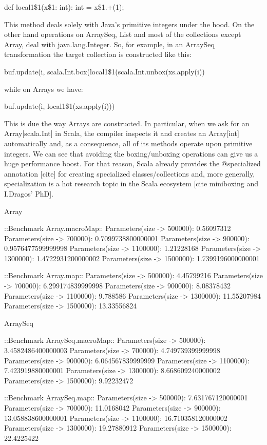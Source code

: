 def local1\$1(x\$1: int): int = x\$1.+(1);

This method deals solely with Java's primitive integers under the hood. On the
other hand operations on ArraySeq, List and most of the collections except
Array, deal with java.lang.Integer. So, for example, in an ArraySeq
transformation the target collection is constructed like this:

buf.update(i, scala.Int.box(local1\$1(scala.Int.unbox(xs.apply(i))

while on Arrays we have:

buf.update(i, local1\$1(xs.apply(i)))

This is due the way Arrays are constructed. In particular, when we ask for an
Array[scala.Int] in Scala, the compiler inspects it and creates an
Array[int] automatically and, as a consequence, all of its methods operate upon
primitive integers. We can see that avoiding the boxing/unboxing operations can
give us a huge performance boost. For that reason, Scala already provides the
@specialized annotation [cite] for creating specialized classes/collections and,
more generally, specialization is a hot research topic in the Scala ecosystem
[cite miniboxing and I.Dragos' PhD].

Array

::Benchmark Array.macroMap::
Parameters(size -> 500000): 0.56097312
Parameters(size -> 700000): 0.7099738800000001
Parameters(size -> 900000): 0.9576477599999998
Parameters(size -> 1100000): 1.21228168
Parameters(size -> 1300000): 1.4722931200000002
Parameters(size -> 1500000): 1.7399196000000001

::Benchmark Array.map::
Parameters(size -> 500000): 4.45799216
Parameters(size -> 700000): 6.299174839999998
Parameters(size -> 900000): 8.08378432
Parameters(size -> 1100000): 9.788586
Parameters(size -> 1300000): 11.55207984
Parameters(size -> 1500000): 13.33556824


ArraySeq

::Benchmark ArraySeq.macroMap::
Parameters(size -> 500000): 3.4582486400000003
Parameters(size -> 700000): 4.749739399999998
Parameters(size -> 900000): 6.064567839999999
Parameters(size -> 1100000): 7.423919880000001
Parameters(size -> 1300000): 8.668609240000002
Parameters(size -> 1500000): 9.92232472

::Benchmark ArraySeq.map::
Parameters(size -> 500000): 7.631767120000001
Parameters(size -> 700000): 11.0168042
Parameters(size -> 900000): 13.058838600000001
Parameters(size -> 1100000): 16.710358120000002
Parameters(size -> 1300000): 19.27880912
Parameters(size -> 1500000): 22.4225422


